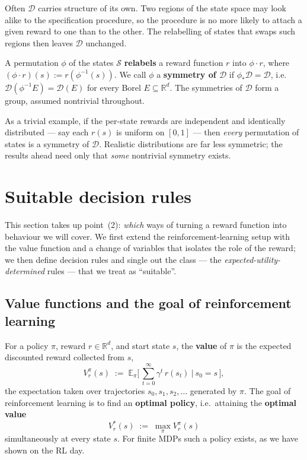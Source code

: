 \documentclass[11pt]{article}
\newcommand{\cS}{\mathcal{S}}
\newcommand{\R}{\mathbb{R}}
\newcommand{\E}{\mathbb{E}}
\newcommand{\Dist}{\mathcal{D}}    %
\begin{document}
Often $\Dist$ carries structure of its own. Two regions of the state space may look alike to the
specification procedure, so the
procedure is no more likely to attach a given reward to one than to the other. The relabelling of
states that swaps such regions then leaves $\Dist$ unchanged.

\begin{definition}[Symmetry of $\Dist$]\label{def:D_symmetry}
A permutation $\phi$ of the states $\cS$ \textbf{relabels} a reward function $r$ into $\phi\cdot r$,
where $(\phi\cdot r)(s) := r(\phi^{-1}(s))$. We call $\phi$ a \textbf{symmetry of $\Dist$} if $\phi_*\Dist = \Dist$, i.e.\
$\Dist(\phi^{-1}E) = \Dist(E)$ for every Borel $E\subseteq\R^d$. The symmetries of $\Dist$ form a
group, assumed nontrivial throughout.
\end{definition}

As a trivial example, if the per-state rewards are independent and identically distributed --- say
each $r(s)$ is uniform on $[0,1]$ --- then \emph{every} permutation of states is a symmetry of
$\Dist$. Realistic distributions are far less symmetric; the results ahead need only that
\emph{some} nontrivial symmetry exists.



\section{Suitable decision rules}\label{prob:decision_rules}

This section takes up point~(2): \emph{which} ways of turning a reward function into
behaviour we will cover. We first extend the reinforcement-learning setup with the value
function and a change of variables that isolates the role of the reward; we then define
decision rules and single out the class --- the \emph{expected-utility-determined} rules
--- that we treat as ``suitable''.

\subsection*{Value functions and the goal of reinforcement learning}


\begin{definition}\label{def:value}
For a policy $\pi$, reward $r\in\R^d$, and start state $s$, the \textbf{value} of $\pi$ is
the expected discounted reward collected from $s$,
$$
V^\pi_r(s) \;:=\; \E_\pi\!\Big[\,\textstyle\sum_{t=0}^{\infty} \gamma^t\, r(s_t)\ \Big|\ s_0 = s\,\Big],
$$
the expectation taken over trajectories $s_0, s_1, s_2, \dots$ generated by $\pi$. The goal of reinforcement learning is to find an \textbf{optimal policy}, i.e.\ attaining the \textbf{optimal value}
$$
V^\ast_r(s) \;:=\; \max_\pi V^\pi_r(s)
$$
simultaneously at every state $s$. For finite MDPs such a policy exists, as we have shown on the RL day.
\end{definition}
\end{document}
